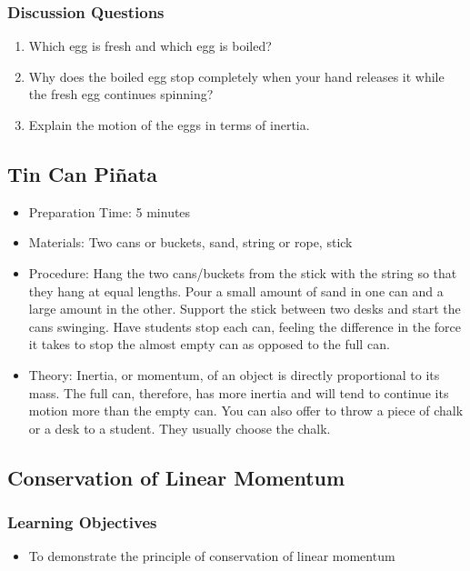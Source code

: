 \subsubsection*{Discussion Questions}
\begin{enumerate}
\item{Which egg is fresh and which egg is boiled?}
\item{Why does the boiled egg stop completely when your hand releases it while the fresh egg continues spinning?}
\item{Explain the motion of the eggs in terms of inertia.} 
\end{enumerate}


\subsection{Tin Can Piñata}
\begin{itemize}
\item{Preparation Time: 5 minutes}
\item{Materials: Two cans or buckets, sand, string or rope, stick}
\item{Procedure: Hang the two cans/buckets from the stick with the string so that they hang at equal lengths. Pour a small amount of sand in one can and a large amount in the other. Support the stick between two desks and start the cans swinging. Have students stop each can, feeling the difference in the force it takes to stop the almost empty can as opposed to the full can.}
\item{Theory: Inertia, or momentum, of an object is directly proportional to its mass. The full can, therefore, has more inertia and will tend to continue its motion more than the empty can. You can also offer to throw a piece of chalk or a desk to a student. They usually choose the chalk.}
\end{itemize}





\subsection{Conservation of Linear Momentum}

\subsubsection*{Learning Objectives}
\begin{itemize}
\item{To demonstrate the principle of conservation of linear momentum}
\end{itemize}

